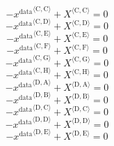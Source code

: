 \begin{equation}
-{x^{\mathrm{data}}}^{\langle \mathrm{\mathrm{C}},\mathrm{\mathrm{C}}\rangle} + {X}^{\langle \mathrm{C},\mathrm{C}\rangle} = 0
\end{equation}
\begin{equation}
-{x^{\mathrm{data}}}^{\langle \mathrm{\mathrm{C}},\mathrm{\mathrm{D}}\rangle} + {X}^{\langle \mathrm{C},\mathrm{D}\rangle} = 0
\end{equation}
\begin{equation}
-{x^{\mathrm{data}}}^{\langle \mathrm{\mathrm{C}},\mathrm{\mathrm{E}}\rangle} + {X}^{\langle \mathrm{C},\mathrm{E}\rangle} = 0
\end{equation}
\begin{equation}
-{x^{\mathrm{data}}}^{\langle \mathrm{\mathrm{C}},\mathrm{\mathrm{F}}\rangle} + {X}^{\langle \mathrm{C},\mathrm{F}\rangle} = 0
\end{equation}
\begin{equation}
-{x^{\mathrm{data}}}^{\langle \mathrm{\mathrm{C}},\mathrm{\mathrm{G}}\rangle} + {X}^{\langle \mathrm{C},\mathrm{G}\rangle} = 0
\end{equation}
\begin{equation}
-{x^{\mathrm{data}}}^{\langle \mathrm{\mathrm{C}},\mathrm{\mathrm{H}}\rangle} + {X}^{\langle \mathrm{C},\mathrm{H}\rangle} = 0
\end{equation}
\begin{equation}
-{x^{\mathrm{data}}}^{\langle \mathrm{\mathrm{D}},\mathrm{\mathrm{A}}\rangle} + {X}^{\langle \mathrm{D},\mathrm{A}\rangle} = 0
\end{equation}
\begin{equation}
-{x^{\mathrm{data}}}^{\langle \mathrm{\mathrm{D}},\mathrm{\mathrm{B}}\rangle} + {X}^{\langle \mathrm{D},\mathrm{B}\rangle} = 0
\end{equation}
\begin{equation}
-{x^{\mathrm{data}}}^{\langle \mathrm{\mathrm{D}},\mathrm{\mathrm{C}}\rangle} + {X}^{\langle \mathrm{D},\mathrm{C}\rangle} = 0
\end{equation}
\begin{equation}
-{x^{\mathrm{data}}}^{\langle \mathrm{\mathrm{D}},\mathrm{\mathrm{D}}\rangle} + {X}^{\langle \mathrm{D},\mathrm{D}\rangle} = 0
\end{equation}
\begin{equation}
-{x^{\mathrm{data}}}^{\langle \mathrm{\mathrm{D}},\mathrm{\mathrm{E}}\rangle} + {X}^{\langle \mathrm{D},\mathrm{E}\rangle} = 0
\end{equation}
